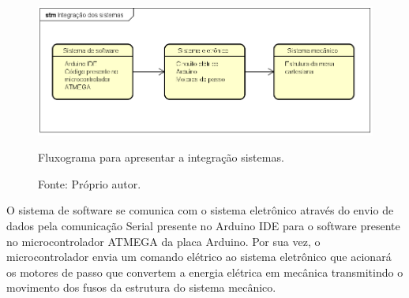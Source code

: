 \begin{figure}[H]
\centering
\includegraphics[width = 1\linewidth]{figuras/integracao}
\caption{Fluxograma para apresentar a integração sistemas.}
\caption*{Fonte: Próprio autor.}
\label{fig:integracao}
\end{figure}
    
O sistema de software se comunica com o sistema eletrônico através do envio de dados pela comunicação 
Serial presente no Arduino IDE para o software presente no microcontrolador ATMEGA da placa Arduino. 
Por sua vez, o microcontrolador envia um comando elétrico ao sistema eletrônico que acionará os motores 
de passo que convertem a energia elétrica em mecânica transmitindo o movimento dos fusos da estrutura do 
sistema mecânico.
